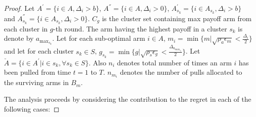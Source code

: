 \begin{proof}
\label{sec:proofTheorem1}
Let $A^{'}=\lbrace i \in A,\Delta_{i}> b\rbrace$,  $A^{''}=\lbrace i \in A, \Delta_{i} > 0\rbrace$, $A^{'}_{s_{k}}=\lbrace i \in A_{s_{k}},\Delta_{i}> b\rbrace$ and $A^{''}_{s_{k}}=\lbrace i \in A_{s_{k}}, \Delta_{i} > 0 \rbrace$. $C_{g}$ is the cluster set containing max payoff arm from each cluster in $g$-th round. The arm having the highest payoff in a cluster $s_{k}$ is denote by $a_{\max_{s_{k}}}$. Let for each sub-optimal arm ${i}\in A$, $m_{i}=\min{\lbrace m|\sqrt{\rho_{a}\epsilon_{m}} < \frac{\Delta_{i}}{2} \rbrace}$ and let for each cluster $s_{k}\in S$, $g_{s_{k}}=\min{\lbrace g|\sqrt{\rho_{s}\epsilon_{g}} < \frac{\Delta_{a_{\max_{s_{k}}}}}{2} \rbrace}$. 
Let $\check{A}=\lbrace {i}\in A^{'} | {i}\in s_{k} , \forall s_{k}\in S \rbrace$. Also $n_{i}$ denotes total number of times an arm $i$ has been pulled from time $t=1$ to $T$. $n_{m_{i}}$ denotes the number of pulls allocated to the surviving arms in $B_{m}$.

The analysis proceeds by considering the contribution to the regret in each of the following cases:


\end{proof}
